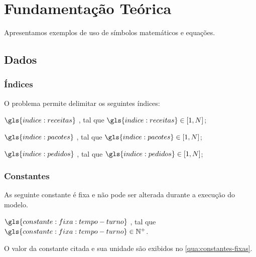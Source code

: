 \section{Fundamentação Teórica}%
\label{sec:fundamentacao}

Apresentamos exemplos de uso de símbolos matemáticos e equações.

\subsection{Dados}

\subsubsection{Índices}

O problema permite delimitar os seguintes índices:

\begin{symbols}
    \item[\( \gls{indice:receitas} \)]
    ,
    tal que \(  \gls{indice:receitas} \in [1, N] \);

    \item[\( \gls{indice:pacotes} \)]
    ,
    tal que \(  \gls{indice:pacotes} \in [1, N] \);

    \item[\( \gls{indice:pedidos} \)]
    ,
    tal que \(  \gls{indice:pedidos} \in [1, N] \);
\end{symbols}

\subsubsection{Constantes}


As seguinte constante é fixa e não pode ser alterada durante a execução do modelo.

\begin{symbols}
    \item[\( \gls{constante:fixa:tempo-turno} \) ]
    ,
    tal que \( \gls{constante:fixa:tempo-turno} \in \mathbb{N}^{+} \).
\end{symbols}

O valor da constante citada e sua unidade são exibidos no \autoref{qua:constantes-fixas}.

